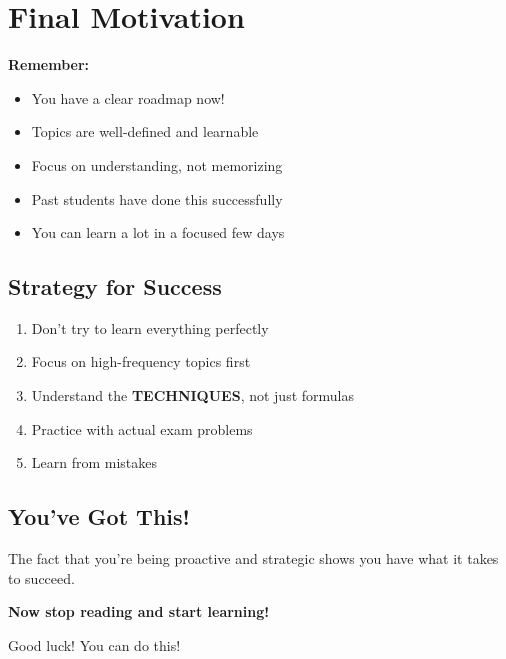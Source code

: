 \documentclass[11pt,letterpaper]{article}
\begin{document}
\newpage

\section{Final Motivation}

\begin{tipbox}
\textbf{Remember:}
\begin{itemize}[leftmargin=*]
  \item You have a clear roadmap now!
  \item Topics are well-defined and learnable
  \item Focus on understanding, not memorizing
  \item Past students have done this successfully
  \item You can learn a lot in a focused few days
\end{itemize}
\end{tipbox}

\subsection{Strategy for Success}

\begin{enumerate}[leftmargin=*]
  \item Don't try to learn everything perfectly
  \item Focus on high-frequency topics first
  \item Understand the \textbf{TECHNIQUES}, not just formulas
  \item Practice with actual exam problems
  \item Learn from mistakes
\end{enumerate}

\subsection{You've Got This!}

The fact that you're being proactive and strategic shows you have what it takes to succeed.

\vspace{1cm}

\begin{center}
\large\textbf{Now stop reading and start learning!}

\vspace{0.5cm}

Good luck! You can do this!
\end{center}
\end{document}
